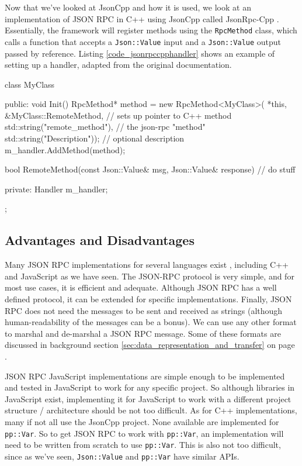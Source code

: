 Now that we've looked at JsonCpp and how it is used, we look at an implementation of JSON RPC in C++ using JsonCpp called JsonRpc-Cpp \cite{jsonrpccpp}. Essentially, the framework will register methods using  the \lstinline{RpcMethod} class, which calls a function that accepts a \lstinline{Json::Value} input and a \lstinline{Json::Value} output passed by reference. Listing \ref{code_jsonrpccpphandler} shows an example of setting up a handler, adapted from the original documentation.

\begin{code}
class MyClass
{
   public:
     void Init()
     {
       RpcMethod* method = new RpcMethod<MyClass>(
           *this, &MyClass::RemoteMethod, // sets up pointer to C++ method
           std::string("remote_method"),  // the json-rpc "method"
           std::string("Description"));   // optional description
       m_handler.AddMethod(method);
     }

     bool RemoteMethod(const Json::Value& msg, Json::Value& response)
     {
       // do stuff
     }

   private:
     Handler m_handler;
};
\end{code}

\subsection{Advantages and Disadvantages} %
\label{sub:jsonrpc_advantages_and_disadvantages}
Many JSON RPC implementations for several languages exist \cite{wikijsonrpc}, including C++ and JavaScript as we have seen. The JSON-RPC protocol is very simple, and for most use cases, it is efficient and adequate. Although JSON RPC has a well defined protocol, it can be extended for specific implementations. Finally, JSON RPC does not need the messages to be sent and received as strings (although human-readability of the messages can be a bonus). We can use any other format to marshal and de-marshal a JSON RPC message. Some of these formats are discussed in background section \ref{sec:data_representation_and_transfer} on page \pageref{sec:data_representation_and_transfer}.

JSON RPC JavaScript implementations are simple enough to be implemented and tested in JavaScript to work for any specific project. So although libraries in JavaScript exist, implementing it for JavaScript to work with a different project structure / architecture should be not too difficult. As for C++ implementations, many if not all use the JsonCpp project. None available are implemented for \lstinline{pp::Var}. So to get JSON RPC to work with \lstinline{pp::Var}, an implementation will need to be written from scratch to use \lstinline{pp::Var}. This is also not too difficult, since as we've seen, \lstinline{Json::Value} and \lstinline{pp::Var} have similar APIs.


